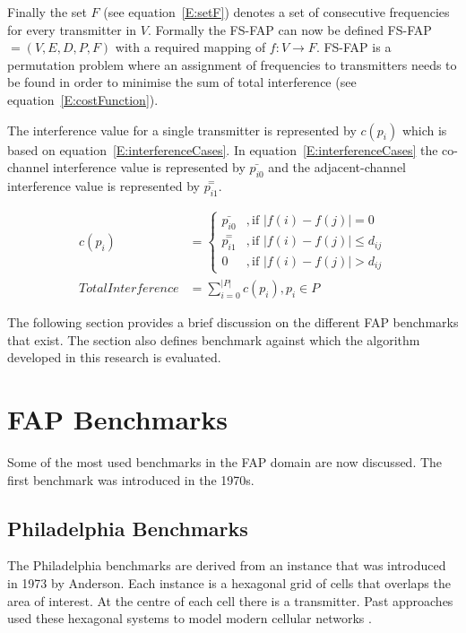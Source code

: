 Finally the set $F$ (see equation~\ref{E:setF}) denotes a set of consecutive frequencies for every transmitter in $V$\cite{FAPOrientationModel,TabuMontemanniSmith}.
Formally the \gls{FS-FAP} can now be defined \gls{FS-FAP} $= (V,E,D,P,F)$ with a required mapping of $f: V \rightarrow F$\cite{TabuMontemanniSmith}. \Gls{FS-FAP} is a permutation problem where an assignment of frequencies to transmitters needs to be found in order to minimise the sum of total interference (see equation~\ref{E:costFunction}).

The interference value for a single transmitter is represented by $c(p_i)$ which is based on equation~\ref{E:interferenceCases}. In equation~\ref{E:interferenceCases} the co-channel interference value is represented by $\bar{p_{i0}}$ and the adjacent-channel interference value is represented by $\overset{=}{p_{i1}}$.

\begin{align} 
 \label{E:interferenceCases}
 c(p_i) &= 
 \begin{cases}
	\bar{p_{i0}} &,\text{if $|f(i) - f(j)| = 0$}\\
	\overset{=}{p_{i1}} &, \text{if $|f(i) - f(j)| \leqslant d_{ij}$}\\
	0 &,\text{if $|f(i) - f(j)| > d_{ij}$}
 \end{cases}\\
 \label{E:costFunction}
 Total Interference &= \sum^{|P|}_{i = 0}c(p_i),p_i \in P 
\end{align}

The following section provides a brief discussion on the different \gls{FAP} benchmarks that exist. The section also defines benchmark against which the algorithm developed in this research is evaluated.
\section{FAP Benchmarks}
\label{sec:FAPBenchmarks}
Some of the most used benchmarks in the \gls{FAP} domain are now discussed. The first benchmark was introduced in the 1970s.
\subsection{Philadelphia Benchmarks}
The Philadelphia benchmarks are derived from an instance that was introduced in 1973 by Anderson\cite{AndersonPhiladelphia}. Each instance is a hexagonal grid of cells that overlaps the area of interest. At the centre of each cell there is a transmitter. Past approaches used these hexagonal systems to model modern cellular networks \cite{Karen2004,ExactMIFAP}.

